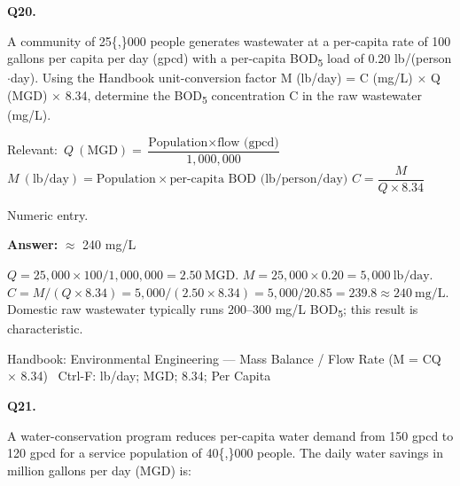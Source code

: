 \documentclass[11pt]{article}
\begin{document}
\vspace{9pt}
\filbreak
\textbf{\color{accent}Q20.}\par\vspace{2pt}
A community of 25\{,\}000 people generates wastewater at a per-capita rate of 100 gallons per capita per day (gpcd) with a per-capita BOD\textsubscript{5} load of 0.20 lb/(person$\cdot$day). Using the Handbook unit-conversion factor M (lb/day) = C (mg/L) $\times$ Q (MGD) $\times$ 8.34, determine the BOD\textsubscript{5} concentration C in the raw wastewater (mg/L).\par\vspace{3pt}
{\small\color{soft}Relevant:}\ $Q\ (\mathrm{MGD}) = \dfrac{\text{Population}\times \text{flow (gpcd)}}{1{,}000{,}000}$ \quad $M\ (\mathrm{lb/day}) = \text{Population}\times \text{per-capita BOD (lb/person/day)}$ \quad $C = \dfrac{M}{Q\times 8.34}$\par\vspace{3pt}
{\small\color{soft}Numeric entry.}\par\vspace{3pt}
\vspace{2pt}\par\noindent\colorbox{boxbg}{\parbox{\dimexpr\linewidth-2\fboxsep\relax}{%
\vspace{2pt}\textbf{Answer:} $\approx$ 240 mg/L\par\vspace{2pt}
{\small $Q = 25{,}000\times100/1{,}000{,}000 = 2.50\ \mathrm{MGD}$.  $M = 25{,}000\times0.20 = 5{,}000\ \mathrm{lb/day}$.  $C = M/(Q\times8.34) = 5{,}000/(2.50\times8.34) = 5{,}000/20.85 = 239.8\approx240\ \mathrm{mg/L}$. Domestic raw wastewater typically runs 200--300 mg/L BOD\textsubscript{5}; this result is characteristic.}\par\vspace{2pt}
{\footnotesize\color{soft}Handbook: Environmental Engineering --- Mass Balance / Flow Rate (M = CQ $\times$ 8.34) \textbullet\ Ctrl-F: lb/day; MGD; 8.34; Per Capita}\vspace{2pt}
}}
\vspace{9pt}
\filbreak
\textbf{\color{accent}Q21.}\par\vspace{2pt}
A water-conservation program reduces per-capita water demand from 150 gpcd to 120 gpcd for a service population of 40\{,\}000 people. The daily water savings in million gallons per day (MGD) is:\par\vspace{3pt}
\end{document}
